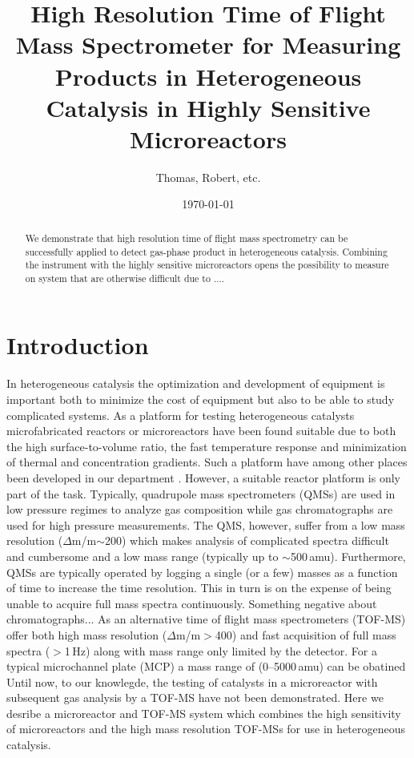 \documentclass[11pt]{article}
\title{High Resolution Time of Flight Mass Spectrometer for Measuring Products in Heterogeneous Catalysis in Highly Sensitive Microreactors}
\author{Thomas, Robert, etc.}
\date{\today}
\begin{document}
\maketitle

\begin{abstract}
We demonstrate that high resolution time of flight mass spectrometry can be successfully applied to detect gas-phase product in heterogeneous catalysis. Combining the instrument with the highly sensitive microreactors opens the possibility to measure on system that are otherwise difficult due to ....
\end{abstract}

\section{Introduction}
In heterogeneous catalysis the optimization and development of equipment is important both to minimize the cost of equipment but also to be able to study complicated systems. As a platform for testing heterogeneous catalysts microfabricated reactors or microreactors have been found suitable due to both the high surface-to-volume ratio, the fast temperature response and minimization of thermal and concentration gradients. Such a platform have among other places been developed in our department \cite{Henriksen2009}. However, a suitable reactor platform is only part of the task. Typically, quadrupole mass spectrometers (QMSs) are used in low pressure regimes to analyze gas composition while gas chromatographs are used for high pressure measurements. The QMS, however, suffer from a low mass resolution ($\Delta$m/m$\sim$200) which makes analysis of complicated spectra difficult and cumbersome and a low mass range (typically up to $\sim$500\,amu). Furthermore, QMSs are typically operated by logging a single (or a few) masses as a function of time to increase the time resolution. This in turn is on the expense of being unable to acquire full mass spectra continuously. Something negative about chromatographs... As an alternative time of flight mass spectrometers (TOF-MS) offer both high mass resolution ($\Delta$m/m$>$400) and fast acquisition of full mass spectra ($>$1\,Hz) along with mass range only limited by the detector. For a typical microchannel plate (MCP) a mass range of (0--5000\,amu) can be obatined Until now, to our knowlegde, the testing of catalysts in a microreactor with subsequent gas analysis by a TOF-MS have not been demonstrated. Here we desribe a microreactor and TOF-MS system which combines the high sensitivity of microreactors and the high mass resolution TOF-MSs for use in heterogeneous catalysis.
\end{document}
